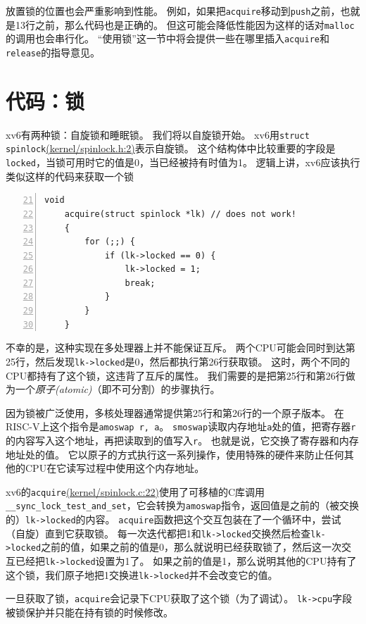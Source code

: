 放置锁的位置也会严重影响到性能。
例如，如果把\texttt{acquire}移动到\texttt{push}之前，也就是13行之前，那么代码也是正确的。
但这可能会降低性能因为这样的话对\texttt{malloc}的调用也会串行化。
“使用锁”这一节中将会提供一些在哪里插入\texttt{acquire}和\texttt{release}的指导意见。

\section{代码：锁}
xv6有两种锁：自旋锁和睡眠锁。
我们将以自旋锁开始。
xv6用\texttt{struct spinlock}\href{https://github.com/mit-pdos/xv6-riscv/blob/riscv//kernel/spinlock.h#L2}{(kernel/spinlock.h:2)}表示自旋锁。
这个结构体中比较重要的字段是\texttt{locked}，当锁可用时它的值是0，当已经被持有时值为1。
逻辑上讲，xv6应该执行类似这样的代码来获取一个锁
\begin{lstlisting}[numbers=left,firstnumber=21]
    void
    acquire(struct spinlock *lk) // does not work!
    {
        for (;;) {
            if (lk->locked == 0) {
                lk->locked = 1;
                break;
            }
        }
    }
\end{lstlisting}
不幸的是，这种实现在多处理器上并不能保证互斥。
两个CPU可能会同时到达第25行，然后发现\texttt{lk->locked}是0，然后都执行第26行获取锁。
这时，两个不同的CPU都持有了这个锁，这违背了互斥的属性。
我们需要的是把第25行和第26行做为一个\emph{原子(atomic)}（即不可分割）的步骤执行。

因为锁被广泛使用，多核处理器通常提供第25行和第26行的一个原子版本。
在RISC-V上这个指令是\texttt{amoswap r, a}。
\texttt{smoswap}读取内存地址\texttt{a}处的值，把寄存器\texttt{r}的内容写入这个地址，再把读取到的值写入\texttt{r}。
也就是说，它交换了寄存器和内存地址处的值。
它以原子的方式执行这一系列操作，使用特殊的硬件来防止任何其他的CPU在它读写过程中使用这个内存地址。

xv6的\texttt{acquire}\href{https://github.com/mit-pdos/xv6-riscv/blob/riscv//kernel/spinlock.c#L22}{(kernel/spinlock.c:22)}使用了可移植的C库调用\texttt{\_\_sync\_lock\_test\_and\_set}，它会转换为\texttt{amoswap}指令，返回值是之前的（被交换的）\texttt{lk->locked}的内容。
\texttt{acquire}函数把这个交互包装在了一个循环中，尝试（自旋）直到它获取锁。
每一次迭代都把1和\texttt{lk->locked}交换然后检查\texttt{lk->locked}之前的值，如果之前的值是0，那么就说明已经获取锁了，然后这一次交互已经把\texttt{lk->locked}设置为1了。
如果之前的值是1，那么说明其他的CPU持有了这个锁，我们原子地把1交换进\texttt{lk->locked}并不会改变它的值。

一旦获取了锁，\texttt{acquire}会记录下CPU获取了这个锁（为了调试）。
\texttt{lk->cpu}字段被锁保护并只能在持有锁的时候修改。

